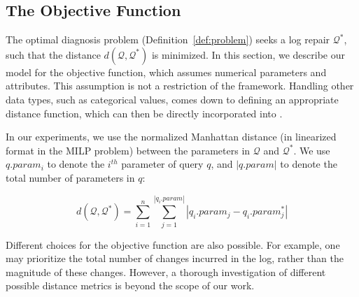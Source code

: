 
\subsection{The Objective Function}\label{sec:objfunction}

The optimal diagnosis problem (Definition~\ref{def:problem}) seeks a
log repair $\mathcal{Q}^*$, such that the distance
$d(\mathcal{Q},\mathcal{Q}^*)$ is minimized.  In this section, we
describe our model for the objective function, which assumes numerical
parameters and attributes. This assumption is not a restriction of the
\sys framework.
Handling other data types, such as categorical values, comes down to defining an appropriate distance function, which can then be directly incorporated into \sys.

In our experiments, we use the normalized Manhattan
distance (in linearized format in the MILP problem) 
between the parameters in $\mathcal{Q}$ and
$\mathcal{Q}^*$. We use $q.param_i$ to denote the $i^{th}$ parameter
of query $q$, and $|q.param|$ to denote the total number of parameters
in $q$: 

\[d(\mathcal{Q}, \mathcal{Q}^*) = \sum_{i = 1} ^{n} \sum_{j =
1}^{|q_i.param|} |q_i.param_j - q_i.param_j^*|\]
\vspace*{-0.1in}

Different choices for the objective function are also possible. For
example, one may prioritize the total number of changes incurred in
the log, rather than the magnitude of these changes. However, a
thorough investigation of different possible distance metrics is
beyond the scope of our work.


